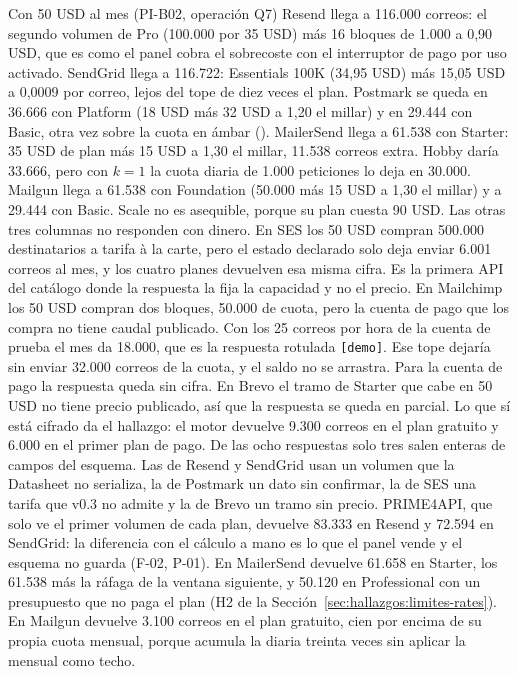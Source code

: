 Con 50 USD al mes (PI-B02, operación Q7) Resend llega a 116.000 correos: el segundo
volumen de Pro (100.000 por 35 USD) más 16 bloques de 1.000 a 0,90 USD, que es como el
panel cobra el sobrecoste con el interruptor de pago por uso activado.
SendGrid llega a 116.722: Essentials 100K (34,95 USD) más 15,05 USD a 0,0009 por
correo, lejos del tope de diez veces el plan.
Postmark se queda en 36.666 con Platform (18 USD más 32 USD a 1,20 el millar) y en
29.444 con Basic, otra vez sobre la cuota en ámbar (\semambar{}).
MailerSend llega a 61.538 con Starter: 35 USD de plan más 15 USD a 1,30 el millar,
11.538 correos extra. Hobby daría 33.666, pero con $k = 1$ la cuota diaria de 1.000
peticiones lo deja en 30.000.
Mailgun llega a 61.538 con Foundation (50.000 más 15 USD a 1,30 el millar) y a 29.444
con Basic. Scale no es asequible, porque su plan cuesta 90 USD.
Las otras tres columnas no responden con dinero. En SES los 50 USD compran 500.000
destinatarios a tarifa à la carte, pero el estado declarado solo deja enviar 6.001
correos al mes, y los cuatro planes devuelven esa misma cifra. Es la primera API del
catálogo donde la respuesta la fija la capacidad y no el precio.
En Mailchimp los 50 USD compran dos bloques, 50.000 de cuota, pero la cuenta de pago que
los compra no tiene caudal publicado. Con los 25 correos por hora de la cuenta de prueba el
mes da 18.000, que es la respuesta rotulada \texttt{[demo]}. Ese tope dejaría sin
enviar 32.000 correos de la cuota, y el saldo no se arrastra. Para la cuenta de pago la
respuesta queda sin cifra.
En Brevo el tramo de Starter que cabe en 50 USD no tiene precio publicado, así que la
respuesta se queda en parcial. Lo que sí está cifrado da el hallazgo: el motor devuelve
9.300 correos en el plan gratuito y 6.000 en el primer plan de pago.
De las ocho respuestas solo tres salen enteras de campos del esquema. Las de Resend y
SendGrid usan un volumen que la Datasheet no serializa, la de Postmark un dato sin
confirmar, la de SES una tarifa que v0.3 no admite y la de Brevo un tramo sin precio.
PRIME4API, que solo ve el primer volumen de cada plan, devuelve 83.333 en Resend y
72.594 en SendGrid: la diferencia con el cálculo a mano es lo que el panel vende y el
esquema no guarda (F-02, P-01).
En MailerSend devuelve 61.658 en Starter, los 61.538 más la ráfaga de la ventana
siguiente, y 50.120 en Professional con un presupuesto que no paga el plan (H2 de la
Sección~\ref{sec:hallazgos:limites-rates}). En Mailgun devuelve 3.100 correos en el plan
gratuito, cien por encima de su propia cuota mensual, porque acumula la diaria treinta
veces sin aplicar la mensual como techo.


